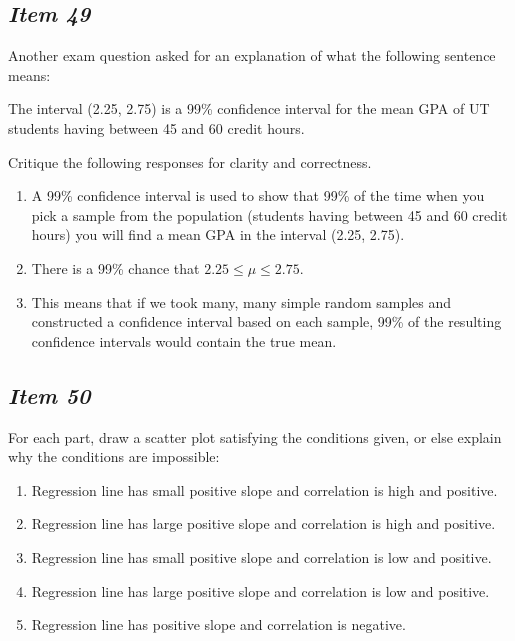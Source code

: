 \subsection{\textbf{\textit{Item 49}}}

Another exam question asked for an explanation of what the following sentence means:

The interval (2.25, 2.75) is a 99\% confidence interval for the mean GPA of UT students having between 45 and 60 credit hours.

Critique the following responses for clarity and correctness.

\begin{enumerate} [leftmargin=1cm, itemsep=.2em]
\item A 99\% confidence interval is used to show that 99\% of the time when you pick a sample from the population  (students having between 45 and 60 credit hours) you will find a mean GPA in the interval (2.25, 2.75).

\item 
There is a 99\% chance that $2.25 \leq \mu \leq  2.75$.

\item This means that if we took many, many simple random samples and constructed a confidence interval based on each sample,  99\% of the resulting confidence intervals would contain the true mean.
\end{enumerate}

\subsection{\textbf{\textit{Item 50}}}
For each part, draw a scatter plot satisfying the conditions given, or else explain why the conditions are impossible:
\begin{enumerate} [leftmargin=1cm, itemsep=.2em]
\item Regression line has small positive slope and correlation is high and positive.
\item Regression line has large positive slope and correlation is high and positive.
\item Regression line has small positive slope and correlation is low and positive.
\item Regression line has large positive slope and correlation is low and positive.
\item Regression line has positive slope and correlation is negative.
\end{enumerate}



